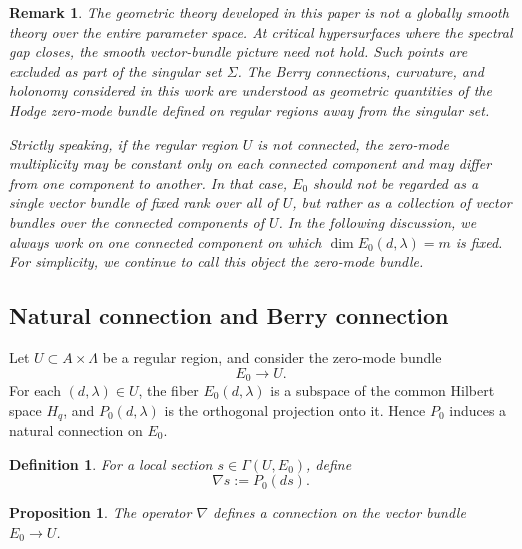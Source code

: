 \documentclass[10pt,a4paper]{amsart}
\newtheorem{proposition}[theorem]{Proposition}%
\newtheorem{remark}{Remark}%
\newtheorem{definition}{Definition}%
\begin{document}
\begin{remark}
The geometric theory developed in this paper is not a globally smooth theory
over the entire parameter space. At critical hypersurfaces where the spectral gap closes, the smooth vector-bundle picture need not hold.
Such points are excluded as part of the singular set \(\Sigma\). The Berry
connections, curvature, and holonomy considered in this work are understood as
geometric quantities of the Hodge zero-mode bundle defined on regular regions
away from the singular set.

Strictly speaking, if the regular region \(U\) is not connected, the
zero-mode multiplicity may be constant only on each connected component and
may differ from one component to another. In that case, \(E_0\) should not be
regarded as a single vector bundle of fixed rank over all of \(U\), but rather as
a collection of vector bundles over the connected components of \(U\). In the
following discussion, we always work on one connected component on which
\(\dim E_0(d,\lambda)=m\) is fixed. For simplicity, we continue to call this object
the zero-mode bundle.
\end{remark}
















\subsection{Natural connection and Berry connection}

Let \(U\subset A\times\Lambda\) be a regular region, and consider the zero-mode bundle
\[
E_0\to U.
\]
For each \((d,\lambda)\in U\), the fiber \(E_0(d,\lambda)\) is a subspace of the common Hilbert space \(H_q\), and \(P_0(d,\lambda)\) is the orthogonal projection onto it. Hence \(P_0\) induces a natural connection on \(E_0\).

\begin{definition}
For a local section \(s\in\Gamma(U,E_0)\), define
\[
\nabla s:=P_0(ds).
\]
\end{definition}

\begin{proposition}
The operator \(\nabla\) defines a connection on the vector bundle \(E_0\to U\).
\end{proposition}
\end{document}
